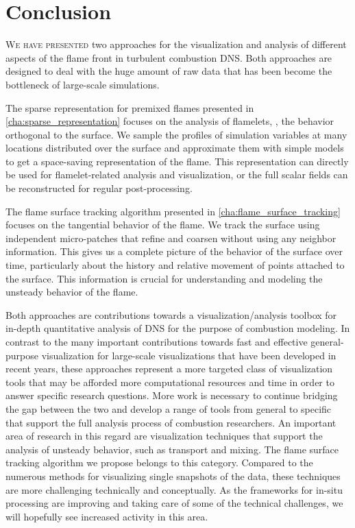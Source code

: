 \chapter{Conclusion} %
\label{cha:flame_vis_conclusions}
%
\lettrine[loversize=-0.015, findent=-1pt]{W}{e have presented} two approaches
for the visualization and analysis of different aspects of the flame front in
turbulent combustion \ac{DNS}.
%
Both approaches are designed to deal with the huge amount of raw data that has
been become the bottleneck of large-scale simulations.
%

%
The sparse representation for premixed flames presented in
\cref{cha:sparse_representation} focuses on the analysis of flamelets, \ie{}, the
behavior orthogonal to the surface.
%
We sample the profiles of simulation variables at many locations distributed
over the surface and approximate them with simple models to get a space-saving
representation of the flame.
%
This representation can directly be used for flamelet-related analysis and
visualization, or the full scalar fields can be reconstructed for regular
post-processing.
%

%
The flame surface tracking algorithm presented in
\cref{cha:flame_surface_tracking} focuses on the tangential behavior of the
flame.
%
We track the surface using independent micro-patches that refine and coarsen
without using any neighbor information.
%
This gives us a complete picture of the behavior of the surface over time,
particularly about the history and relative movement of points attached to the
surface.
%
This information is crucial for understanding and modeling the unsteady behavior
of the flame.
%

%
Both approaches are contributions towards a visualization/analysis toolbox for
in-depth quantitative analysis of \ac{DNS} for the purpose of combustion
modeling.
%
In contrast to the many important contributions towards fast and effective
general-purpose visualization for large-scale visualizations that have been
developed in recent years, these approaches represent a more targeted class
of visualization tools that may be afforded more computational resources and
time in order to answer specific research questions.
%
More work is necessary to continue bridging the gap between the two and
develop a range of tools from general to specific that support the full analysis
process of combustion researchers.
%
An important area of research in this regard are visualization techniques that
support the analysis of unsteady behavior, such as transport and mixing.
%
The flame surface tracking algorithm we propose belongs to this category.
%
Compared to the numerous methods for visualizing single snapshots of the data,
these techniques are more challenging technically and conceptually.
%
As the frameworks for in-situ processing are improving and taking care of some
of the technical challenges, we will hopefully see increased activity in this
area.
%
